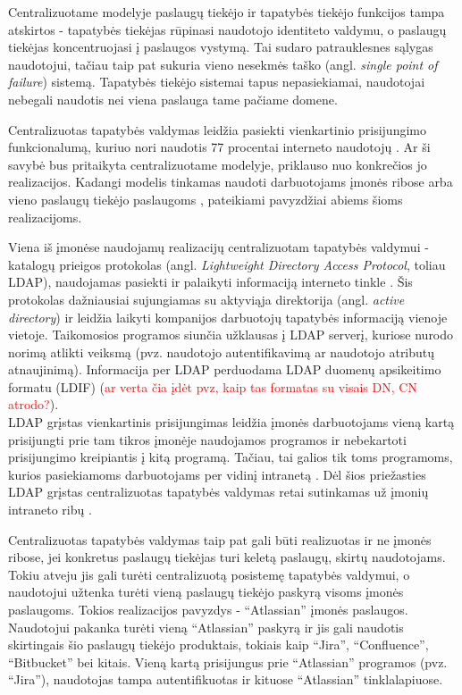 Centralizuotame modelyje paslaugų tiekėjo ir tapatybės tiekėjo funkcijos tampa atskirtos - 
tapatybės tiekėjas rūpinasi naudotojo identiteto valdymu, o paslaugų tiekėjas koncentruojasi į paslaugos vystymą. Tai sudaro patrauklesnes sąlygas
naudotojui, tačiau taip pat sukuria vieno nesekmės taško (angl. \textit{single point of failure}) sistemą. Tapatybės tiekėjo sistemai tapus nepasiekiamai,
naudotojai nebegali naudotis nei viena paslauga tame pačiame domene.


Centralizuotas tapatybės valdymas leidžia pasiekti vienkartinio prisijungimo funkcionalumą, kuriuo nori naudotis
77 procentai interneto naudotojų \cite{SSOResearch}. Ar ši savybė bus pritaikyta centralizuotame modelyje, priklauso nuo
konkrečios jo realizacijos. Kadangi modelis tinkamas naudoti darbuotojams įmonės ribose arba vieno paslaugų tiekėjo paslaugoms \cite{Josang2005},
pateikiami pavyzdžiai abiems šioms realizacijoms. 

Viena iš įmonėse naudojamų realizacijų centralizuotam tapatybės valdymui - 
katalogų prieigos protokolas (angl. \textit{Lightweight Directory Access Protocol}, toliau LDAP), naudojamas pasiekti ir palaikyti informaciją interneto tinkle \cite{Strictest2011}.
Šis protokolas dažniausiai sujungiamas su aktyviąja direktorija (angl. \textit{active directory}) ir leidžia laikyti kompanijos darbuotojų
tapatybės informaciją vienoje vietoje. Taikomosios programos siunčia užklausas į LDAP serverį, kuriose nurodo norimą atlikti veiksmą (pvz. naudotojo
autentifikavimą ar naudotojo atributų atnaujinimą). Informacija per LDAP perduodama LDAP duomenų apsikeitimo formatu (LDIF) (\textcolor{red}{ar verta čia įdėt pvz, kaip tas
formatas su visais DN, CN atrodo?}).\\
LDAP grįstas vienkartinis prisijungimas leidžia įmonės darbuotojams vieną kartą prisijungti prie tam tikros įmonėje naudojamos programos ir
nebekartoti prisijungimo kreipiantis į kitą programą. Tačiau, tai galios tik toms programoms, kurios pasiekiamoms darbuotojams per vidinį intranetą
\cite{Strictest2011}. Dėl šios priežasties LDAP grįstas centralizuotas tapatybės valdymas retai sutinkamas už įmonių intraneto ribų \cite{Strictest2011}.

Centralizuotas tapatybės valdymas taip pat gali būti realizuotas ir ne įmonės ribose, jei konkretus paslaugų tiekėjas
turi keletą paslaugų, skirtų naudotojams. Tokiu atveju jis gali turėti centralizuotą posistemę tapatybės valdymui, o naudotojui užtenka
turėti vieną paslaugų tiekėjo paskyrą visoms įmonės paslaugoms. Tokios realizacijos pavyzdys - \enquote{Atlassian} įmonės paslaugos. Naudotojui pakanka turėti vieną \enquote{Atlassian} paskyrą ir jis gali naudotis
skirtingais šio paslaugų tiekėjo produktais, tokiais kaip \enquote{Jira}, \enquote{Confluence}, \enquote{Bitbucket} bei kitais. Vieną kartą prisijungus prie \enquote{Atlassian} programos (pvz. \enquote{Jira}),
naudotojas tampa autentifikuotas ir kituose \enquote{Atlassian} tinklalapiuose. 

